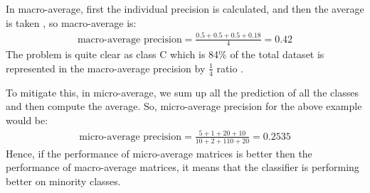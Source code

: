 In macro-average, first the individual precision is calculated, and then the average is taken \cite{manning2009introduction}, so macro-average is:
\begin{align}
    \text{macro-average precision} = \frac{0.5+0.5+0.5+0.18}{4} = 0.42
\end{align}
The problem is quite clear as class C which is 84\% of the total dataset is represented in the macro-average precision by $\frac{1}{4}$ ratio \cite{manning2009introduction}.

To mitigate this, in micro-average, we sum up all the prediction of all the classes and then compute the average.
So, micro-average precision for the above example would be:
\begin{align}
    \text{micro-average precision} = \frac{5+1+20+10}{10+2+110+20} = 0.2535
\end{align}
Hence, if the performance of micro-average matrices is better then the performance of macro-average matrices, it means that the classifier is performing better on minority classes.




